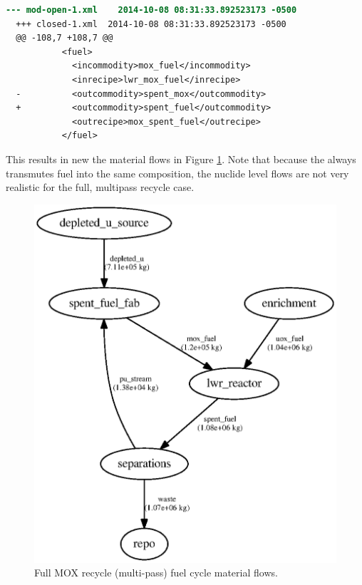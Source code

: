 \begin{lstlisting}[language=diff]
  --- mod-open-1.xml	2014-10-08 08:31:33.892523173 -0500
  +++ closed-1.xml	2014-10-08 08:31:33.892523173 -0500
  @@ -108,7 +108,7 @@
           <fuel>         
             <incommodity>mox_fuel</incommodity>
             <inrecipe>lwr_mox_fuel</inrecipe>
  -          <outcommodity>spent_mox</outcommodity>
  +          <outcommodity>spent_fuel</outcommodity>
             <outrecipe>mox_spent_fuel</outrecipe>
           </fuel>
\end{lstlisting}

This results in new the material flows in Figure \ref{fig:flowclosed}. Note
that because the  always transmutes fuel into the same
composition, the nuclide level flows are not very realistic for the full, multipass
recycle case.

\begin{figure}[H]
\label{fig:flowclosed}
\caption{Full MOX recycle (multi-pass) fuel cycle material flows.}
\begin{center}
\includegraphics{./images/flow-closed-1.eps}
\end{center}
\end{figure}

